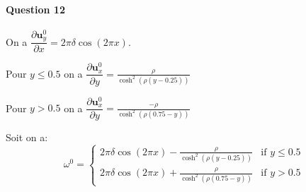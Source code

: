 \documentclass{article}
\newcommand{\pd}[2]{\dfrac{\partial#1}{\partial#2}}
\begin{document}
\paragraph{Question 12}
On a $\pd{\mathbf{u}_y^0}{x}=2\pi\delta\cos(2\pi x)$.

Pour $y \leq 0.5$ on a $\pd{\mathbf{u}_x^0}{y}=\frac{\rho}{\cosh^2(\rho(y-0.25))}$

Pour $y > 0.5$ on a $\pd{\mathbf{u}_x^0}{y}=\frac{-\rho}{\cosh^2(\rho(0.75-y))}$


Soit on a:
\begin{equation*}
	\omega^0 =
	\begin{cases}
		2\pi\delta\cos(2\pi x) - \frac{\rho}{\cosh^2(\rho(y-0.25))} & \text{if }y\leq 0.5 \\
		2\pi\delta\cos(2\pi x) + \frac{\rho}{\cosh^2(\rho(0.75-y))}  & \text{if }y > 0.5
	\end{cases}
\end{equation*}

\begin{appendix}
  \listoffigures
\end{appendix}
\end{document}
